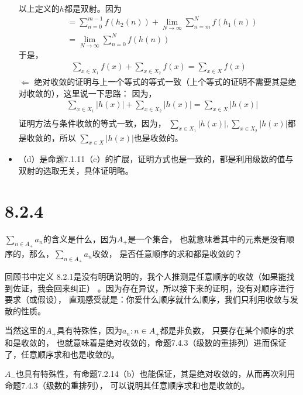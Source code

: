 \documentclass{article}
\begin{document}
\begin{itemize}
        以上定义的$h$都是双射。因为
        \begin{align*}
           & = \sum \limits_{n=0}^{m-1} f(h_2(n)) + \lim \limits_{N \rightarrow \infty} \sum \limits_{n=m}^N f(h_1(n)) \\
           & = \lim \limits_{N \rightarrow \infty} \sum \limits_{n=0}^N  f(h(n))
        \end{align*}
        于是，
        \begin{align*}
          \sum \limits_{x \in X_1} f(x) + \sum \limits_{x \in X_2} f(x) = \sum \limits_{x \in X} f(x)
        \end{align*}
        $\Leftarrow$ 绝对收敛的证明与上一个等式的等式一致（上个等式的证明不需要其是绝对收敛的），这里说一下思路：
        因为，
        \begin{align*}
           & \sum \limits_{x \in X_1} |h(x)| + \sum \limits_{x \in X_2} |h(x)| = \sum \limits_{x \in X} |h(x)| \\
        \end{align*}
        证明方法与条件收敛的等式一致，因为，
        $\sum \limits_{x \in X_1} |h(x)|,\sum \limits_{x \in X_2} |h(x)|$都是收敛的，所以
        $\sum \limits_{x \in X} |h(x)|$也是收敛的。
  \item （d）是命题7.1.11（c）的扩展，证明方式也是一致的，都是利用级数的值与双射的选取无关，具体证明略。
\end{itemize}

\section*{8.2.4}
\begin{zremark}
  $\sum \limits_{n \in A_{+}} a_n$的含义是什么，因为$A_{+}$是一个集合，
  也就意味着其中的元素是没有顺序的，那么，$\sum \limits_{n \in A_{+}} a_n$收敛，
  是否任意顺序的求和都是收敛的？

  回顾书中定义 8.2.1是没有明确说明的，我个人推测是任意顺序的收敛（如果能找到佐证，我会回来纠正）
  。因为存在异议，所以接下来的证明，没有对顺序进行要求（或假设），
  直观感受就是：你爱什么顺序就什么顺序，我们只利用收敛与发散的性质。

  当然这里的$A_{+}$具有特殊性，因为$a_n: n \in A_{+}$都是非负数，
  只要存在某个顺序的求和是收敛的，
  也就意味着是绝对收敛的，命题7.4.3（级数的重排列）进而保证了，任意顺序求和也是收敛的。

  $A_{-}$也具有特殊性，有命题7.2.14（b）也能保证，其是绝对收敛的，从而再次利用命题7.4.3（级数的重排列），
  可以说明其任意顺序求和也是收敛的。
\end{zremark}
\end{document}
